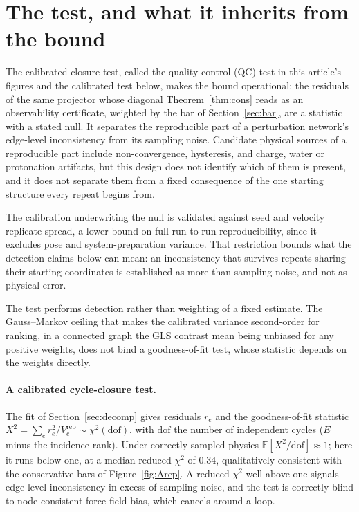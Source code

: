 \section{The test, and what it inherits from the bound}\label{sec:qc}
The calibrated closure test, called the quality-control (QC) test in this article's figures and
the calibrated test below, makes the bound operational: the residuals of the same projector whose
diagonal Theorem~\ref{thm:cons} reads as an observability certificate, weighted by the bar of
Section~\ref{sec:bar}, are a statistic with a stated null. It separates the reproducible part of a
perturbation network's edge-level inconsistency from its sampling noise. Candidate physical sources
of a reproducible part include non-convergence, hysteresis, and charge, water or protonation
artifacts, but this design does not identify which of them is present, and it does not separate
them from a fixed consequence of the one starting structure every repeat begins from.

The calibration underwriting the null is validated against seed and velocity replicate spread, a
lower bound on full run-to-run reproducibility, since it excludes pose and system-preparation
variance. That restriction bounds what the detection claims below can mean: an inconsistency that
survives repeats sharing their starting coordinates is established as more than sampling noise, and
not as physical error.

The test performs detection rather than weighting of a fixed estimate. The Gauss--Markov ceiling
that makes the calibrated variance second-order for ranking, in a connected graph the GLS contrast
mean being unbiased for any positive weights, does not bind a goodness-of-fit test, whose statistic
depends on the weights directly.

\paragraph{A calibrated cycle-closure test.} The fit of Section~\ref{sec:decomp} gives
residuals $r_e$ and the goodness-of-fit statistic
$X^2=\sum_e r_e^2/V_e^{\mathrm{rep}}\sim\chi^2(\mathrm{dof})$,
with $\mathrm{dof}$ the number of independent cycles ($E$ minus the incidence rank). Under
correctly-sampled physics $\mathbb{E}[X^2/\mathrm{dof}]\approx1$; here it runs below one, at a
median reduced $\chi^2$ of $0.34$, qualitatively consistent with the conservative bars of
Figure~\ref{fig:Arep}. A reduced $\chi^2$ well above one signals edge-level inconsistency in excess
of sampling noise, and the test is correctly blind to node-consistent force-field bias, which
cancels around a loop.

